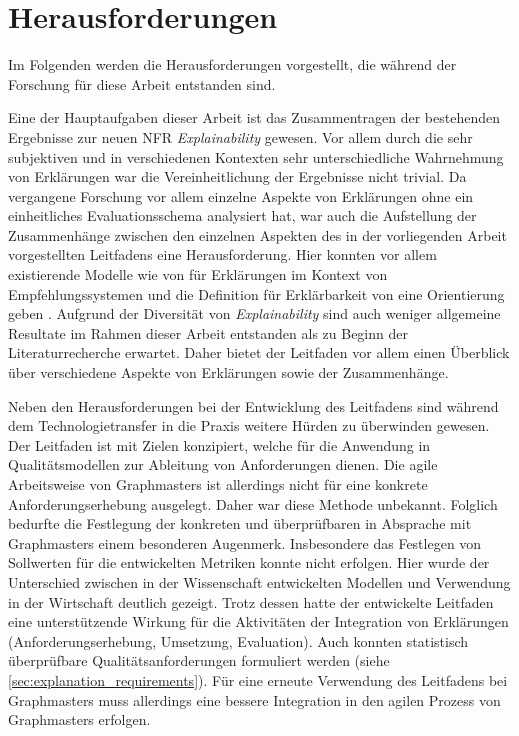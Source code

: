 \section{Herausforderungen}

Im Folgenden werden die Herausforderungen vorgestellt, die während der Forschung für diese Arbeit entstanden sind.

Eine der Hauptaufgaben dieser Arbeit ist das Zusammentragen der bestehenden Ergebnisse zur neuen NFR \textit{Explainability} gewesen. Vor allem durch die sehr subjektiven und in verschiedenen Kontexten sehr unterschiedliche Wahrnehmung von Erklärungen war die Vereinheitlichung der Ergebnisse nicht trivial. Da vergangene Forschung vor allem einzelne Aspekte von Erklärungen ohne ein einheitliches Evaluationsschema analysiert hat, war auch die Aufstellung der Zusammenhänge zwischen den einzelnen Aspekten des in der vorliegenden Arbeit vorgestellten Leitfadens eine Herausforderung. Hier konnten vor allem existierende Modelle wie von \citeauthor{nunes_systematic_2017} für Erklärungen im Kontext von Empfehlungssystemen und die Definition für Erklärbarkeit von \citeauthor{chazette_knowledge_nodate} eine Orientierung geben \cite{nunes_systematic_2017, chazette_knowledge_nodate}. Aufgrund der Diversität von \textit{Explainability} sind auch weniger allgemeine Resultate im Rahmen dieser Arbeit entstanden als zu Beginn der Literaturrecherche erwartet. Daher bietet der Leitfaden vor allem einen Überblick über verschiedene Aspekte von Erklärungen sowie der Zusammenhänge.

Neben den Herausforderungen bei der Entwicklung des Leitfadens sind während dem Technologietransfer in die Praxis weitere Hürden zu überwinden gewesen. Der Leitfaden ist mit Zielen konzipiert, welche für die Anwendung in Qualitätsmodellen zur Ableitung von Anforderungen dienen. Die agile Arbeitsweise von Graphmasters ist allerdings nicht für eine konkrete Anforderungserhebung ausgelegt. Daher war diese Methode unbekannt. Folglich bedurfte die Festlegung der konkreten und überprüfbaren in Absprache mit Graphmasters einem besonderen Augenmerk. Insbesondere das Festlegen von Sollwerten für die entwickelten Metriken konnte nicht erfolgen. Hier wurde der Unterschied zwischen in der Wissenschaft entwickelten Modellen und Verwendung in der Wirtschaft deutlich gezeigt. Trotz dessen hatte der entwickelte Leitfaden eine unterstützende Wirkung für die Aktivitäten der Integration von Erklärungen (Anforderungserhebung, Umsetzung, Evaluation). Auch konnten statistisch überprüfbare Qualitätsanforderungen formuliert werden (siehe \autoref{sec:explanation_requirements}). Für eine erneute Verwendung des Leitfadens bei Graphmasters muss allerdings eine bessere Integration in den agilen Prozess von Graphmasters erfolgen.